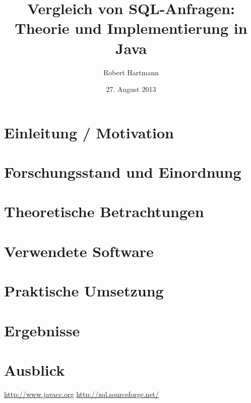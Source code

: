 \documentclass[12pt]{scrreprt}
\author{Robert Hartmann}
\title{Vergleich von SQL-Anfragen: Theorie und Implementierung in Java}
\date{27. August 2013}
\theoremstyle{remark}
\begin{document}

%

\pagestyle{plain}
\tableofcontents

\onehalfspacing

\chapter{Einleitung / Motivation}


\chapter{Forschungsstand und Einordnung}


\chapter{Theoretische Betrachtungen}


\chapter{Verwendete Software}


\chapter{Praktische Umsetzung}


\chapter{Ergebnisse}


\chapter{Ausblick}


\begin{thebibliography}{9}
\url{http://www.javacc.org}
\url{http://zql.sourceforge.net/}
\end{thebibliography}



\end{document}
